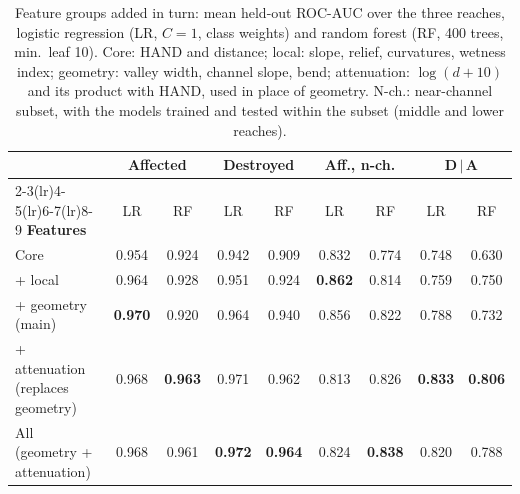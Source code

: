 \documentclass[journal,a4paper]{IEEEtran}
\begin{document}
\begin{table}[t]
\centering\footnotesize
\setlength{\tabcolsep}{5pt}
\caption{Feature groups added in turn: mean held-out ROC-AUC over the three reaches, logistic regression (LR, $C = 1$, class weights) and random forest (RF, 400 trees, min.\ leaf 10). Core: HAND and distance; local: slope, relief, curvatures, wetness index; geometry: valley width, channel slope, bend; attenuation: $\log(d+10)$ and its product with HAND, used in place of geometry. N-ch.: near-channel subset, with the models trained and tested within the subset (middle and lower reaches).}\label{tab:groups}
\begin{tabular}{@{}lcccccccc@{}}
\toprule
 & \multicolumn{2}{c}{\textbf{Affected}} & \multicolumn{2}{c}{\textbf{Destroyed}} & \multicolumn{2}{c}{\textbf{Aff., n-ch.}} & \multicolumn{2}{c}{\textbf{D\,$\mid$\,A}}\\
\cmidrule(lr){2-3}\cmidrule(lr){4-5}\cmidrule(lr){6-7}\cmidrule(lr){8-9}
\textbf{Features} & LR & RF & LR & RF & LR & RF & LR & RF\\
\midrule
Core & 0.954 & 0.924 & 0.942 & 0.909 & 0.832 & 0.774 & 0.748 & 0.630\\
+ local & 0.964 & 0.928 & 0.951 & 0.924 & \textbf{0.862} & 0.814 & 0.759 & 0.750\\
+ geometry (main) & \textbf{0.970} & 0.920 & 0.964 & 0.940 & 0.856 & 0.822 & 0.788 & 0.732\\
+ attenuation (replaces geometry) & 0.968 & \textbf{0.963} & 0.971 & 0.962 & 0.813 & 0.826 & \textbf{0.833} & \textbf{0.806}\\
All (geometry + attenuation) & 0.968 & 0.961 & \textbf{0.972} & \textbf{0.964} & 0.824 & \textbf{0.838} & 0.820 & 0.788\\
\bottomrule
\end{tabular}
\end{table}
\end{document}
